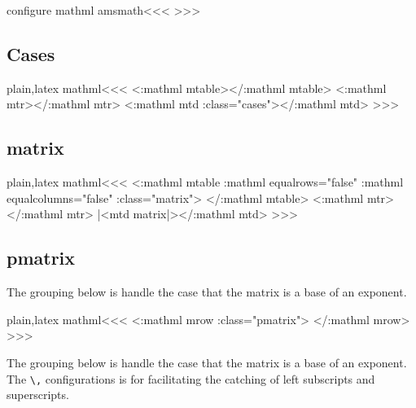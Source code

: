 {{{{{{\<configure mathml amsmath\><<<
   {}  
   {}  
   {}   {}  
   {}
   {} 
   {}
   {}
   {}   {}
   {}
   {}
>>>



\subsection{Cases}

\<plain,latex mathml\><<<
    {}{} {\Tg<\a:mathml mtable>}{\Tg</\a:mathml mtable>}
    {\Tg<\a:mathml mtr>}{\Tg</\a:mathml mtr>}
    {\Tg<\a:mathml mtd \mml:class="cases">}{\Tg</\a:mathml mtd>}
>>>


\subsection{matrix}

\<plain,latex mathml\><<<
   {\Tg<\a:mathml mtable 
        \a:mathml equalrows="false" \a:mathml equalcolumns="false"\Hnewline
          \mml:class="matrix">} 
   {\Tg</\a:mathml mtable>}
   {\Tg<\a:mathml mtr>}{\Tg</\a:mathml mtr>}
   {|<mtd matrix|>}{\Tg</\a:mathml mtd>}
>>>



\subsection{pmatrix}


The grouping below is handle the case that the matrix is a base of an exponent.


\<plain,latex mathml\><<<
  {\bgroup\Tg<\a:mathml mrow\Hnewline
   \mml:class="pmatrix">}  {\Tg</\a:mathml mrow>\egroup}
>>>



The grouping below is handle the case that the matrix is a base of an
exponent. The \verb|\,| configurations is for facilitating the
catching of  left subscripts and superscripts.


}}}}}}
